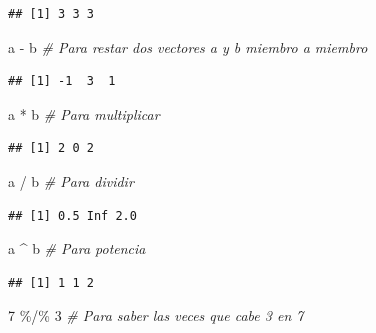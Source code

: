 \documentclass[
]{book}
\makeatletter
\newenvironment{Shaded}{\begin{snugshade}}{\end{snugshade}}
\newcommand{\CommentTok}[1]{\textcolor[rgb]{0.56,0.35,0.01}{\textit{#1}}}
\newcommand{\DecValTok}[1]{\textcolor[rgb]{0.00,0.00,0.81}{#1}}
\newcommand{\NormalTok}[1]{#1}
\newcommand{\SpecialCharTok}[1]{\textcolor[rgb]{0.00,0.00,0.00}{#1}}
\newenvironment{kframe}{%
\medskip{}
\setlength{\fboxsep}{.8em}
 \def\at@end@of@kframe{}%
 \ifinner\ifhmode%
  \def\at@end@of@kframe{\end{minipage}}%
  \begin{minipage}{\columnwidth}%
 \fi\fi%
 \def\FrameCommand##1{\hskip\@totalleftmargin \hskip-\fboxsep
 \colorbox{shadecolor}{##1}\hskip-\fboxsep
     \hskip-\linewidth \hskip-\@totalleftmargin \hskip\columnwidth}%
 \MakeFramed {\advance\hsize-\width
   \@totalleftmargin\z@ \linewidth\hsize
   \@setminipage}}%
 {\par\unskip\endMakeFramed%
 \at@end@of@kframe}
\renewenvironment{Shaded}{\begin{kframe}}{\end{kframe}}
\makeatother
\begin{document}
\begin{verbatim}
## [1] 3 3 3
\end{verbatim}

\begin{Shaded}
\begin{Highlighting}[]
\NormalTok{a }\SpecialCharTok{{-}}\NormalTok{ b  }\CommentTok{\# Para restar dos vectores a y b miembro a miembro}
\end{Highlighting}
\end{Shaded}

\begin{verbatim}
## [1] -1  3  1
\end{verbatim}

\begin{Shaded}
\begin{Highlighting}[]
\NormalTok{a }\SpecialCharTok{*}\NormalTok{ b  }\CommentTok{\# Para multiplicar}
\end{Highlighting}
\end{Shaded}

\begin{verbatim}
## [1] 2 0 2
\end{verbatim}

\begin{Shaded}
\begin{Highlighting}[]
\NormalTok{a }\SpecialCharTok{/}\NormalTok{ b  }\CommentTok{\# Para dividir}
\end{Highlighting}
\end{Shaded}

\begin{verbatim}
## [1] 0.5 Inf 2.0
\end{verbatim}

\begin{Shaded}
\begin{Highlighting}[]
\NormalTok{a }\SpecialCharTok{\^{}}\NormalTok{ b  }\CommentTok{\# Para potencia}
\end{Highlighting}
\end{Shaded}

\begin{verbatim}
## [1] 1 1 2
\end{verbatim}

\begin{Shaded}
\begin{Highlighting}[]
\DecValTok{7} \SpecialCharTok{\%/\%} \DecValTok{3}  \CommentTok{\# Para saber las veces que cabe 3 en 7}
\end{Highlighting}
\end{Shaded}
\end{document}
